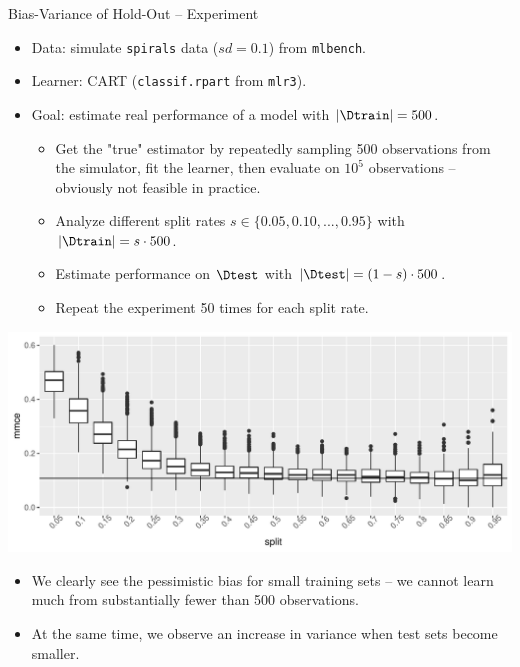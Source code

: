 \documentclass[11pt,compress,t,notes=noshow, xcolor=table]{beamer}
\begin{document}

\begin{vbframe}{Bias-Variance of Hold-Out -- Experiment}

\begin{itemize}
  \item Data: simulate \texttt{spirals} data ($sd = 0.1$) from \texttt{mlbench}.
  \item Learner: CART (\texttt{classif.rpart} from \texttt{mlr3}).
  \item Goal: estimate real performance of a model with $|\Dtrain| = 500$.
  \begin{itemize}
    \item Get the "true" estimator by repeatedly sampling 500 observations from 
    the simulator, fit the learner, then evaluate on $10^5$ observations -- 
    obviously not feasible in practice.
    \item Analyze different split rates $s \in \{0.05, 0.10, ..., 0.95\}$ 
    with $|\Dtrain| = s \cdot 500$.
    \item Estimate performance on $\Dtest$ with $|\Dtest| = (1 - s) \cdot 500$.
    \item Repeat the experiment 50 times for each split rate.
  \end{itemize}
\end{itemize}

\framebreak


\includegraphics[width=\textwidth]{figure/test-holdout-example} 

\lz

\begin{itemize}
  \item We clearly see the pessimistic bias for small training sets -- we cannot 
  learn much from substantially fewer than 500 observations. 
  \item At the same time, we observe an increase in variance when test sets 
  become smaller.
\end{itemize}


\end{vbframe}
\end{document}
